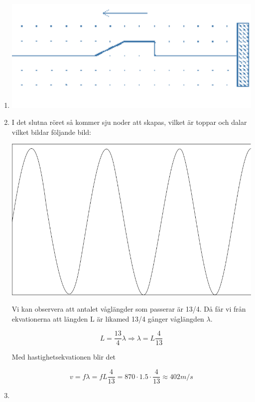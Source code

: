 \documentclass[a4paper,12pt]{article}
\begin{document}
\begin{enumerate}
    \item \includegraphics{Figur 1.png}
    
    \item 
    I det slutna röret så kommer sju noder att skapas,
    vilket är toppar och dalar vilket bildar följande bild:
    \begin{center}
        \includegraphics[scale=0.5]{Figur 2.png}
    \end{center}

    Vi kan observera att antalet våglängder som passerar
    är 13/4. Då får vi från ekvationerna att längden L är 
    likamed 13/4 gånger våglängden $\lambda$.

    $$L=\frac{13}{4}\lambda \Rightarrow \lambda=L\frac{4}{13}$$

    Med hastighetsekvationen blir det 

    $$v=f\lambda=fL\frac{4}{13}=870\cdot 1.5\cdot \frac{4}{13}\approx 402m/s$$

    \item 
\end{enumerate}
\end{document}
